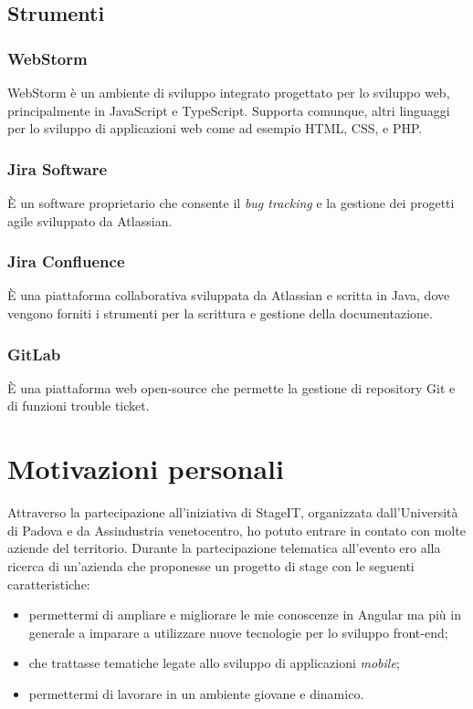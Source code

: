 \subsection{Strumenti}

\subsubsection*{WebStorm}
WebStorm è un ambiente di sviluppo integrato progettato per lo sviluppo web, principalmente in JavaScript e TypeScript. Supporta comunque, altri linguaggi per lo sviluppo di applicazioni web come ad esempio \gls{HTML}, \gls{CSS}, e PHP.

\subsubsection{Jira Software}
È un software proprietario che consente il \emph{bug tracking} e la gestione dei progetti agile sviluppato da Atlassian.

\subsubsection{Jira Confluence}
È una piattaforma collaborativa sviluppata da Atlassian e scritta in Java, dove vengono forniti i strumenti per la scrittura e gestione della documentazione.

\subsubsection{GitLab}
È una piattaforma web \gls{open-source}\ap{[g]} che permette la gestione di repository Git e di funzioni trouble ticket.

\section{Motivazioni personali}
Attraverso la partecipazione all'iniziativa di StageIT, organizzata dall'Università di Padova e da Assindustria venetocentro, ho potuto entrare in contato con molte aziende del territorio.
Durante la partecipazione telematica all'evento ero alla ricerca di un’azienda che proponesse un progetto di stage con le seguenti caratteristiche:

\begin{itemize}
	\item permettermi di ampliare e migliorare le mie conoscenze in Angular ma più in generale a imparare a utilizzare nuove tecnologie per lo sviluppo front-end;
	\item che trattasse tematiche legate allo sviluppo di applicazioni \emph{mobile};
	\item permettermi di lavorare in un ambiente giovane e dinamico.
	
\end{itemize}  

